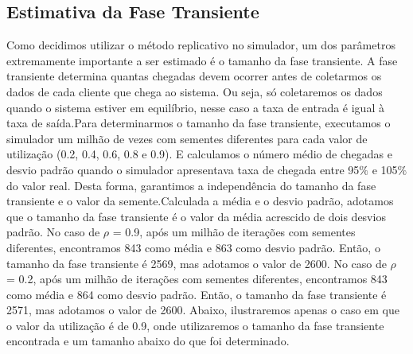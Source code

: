 \documentclass[a4paper,10pt]{article}
\begin{document}
      \subsection{Estimativa da Fase Transiente}
      Como decidimos utilizar o método replicativo no simulador, um dos parâmetros extremamente importante a ser estimado é o tamanho da fase transiente. A fase transiente determina quantas chegadas devem ocorrer antes de coletarmos os 
      dados de cada cliente que chega ao sistema. Ou seja, só coletaremos os dados quando o sistema estiver em equilíbrio, nesse caso a taxa de entrada é igual à taxa de saída.Para determinarmos o tamanho da fase transiente, executamos o
      simulador um milhão de vezes com sementes diferentes para cada valor de utilização (0.2, 0.4, 0.6, 0.8 e 0.9). E calculamos o número médio de chegadas e desvio padrão quando o simulador apresentava taxa de chegada entre 95$\%$ e 105$\%$ 
      do valor real. Desta forma, garantimos a independência do tamanho da fase transiente e o valor da semente.Calculada a média e o desvio padrão, adotamos que o tamanho da fase transiente é o valor da média acrescido de dois desvios padrão.
      No caso de $\rho$ = 0.9, após um milhão de iterações com sementes diferentes, encontramos 843 como média e 863 como desvio padrão. Então, o tamanho da fase transiente é 2569, mas adotamos o valor de 2600.
      No caso de $\rho$ = 0.2, após um milhão de iterações com sementes diferentes, encontramos 843 como média e 864 como desvio padrão. Então, o tamanho da fase transiente é 2571, mas adotamos o valor de 2600.
      Abaixo, ilustraremos apenas o caso em que o valor da utilização é de 0.9, onde utilizaremos o tamanho da fase transiente encontrada e um tamanho abaixo do que foi determinado.
\end{document}
